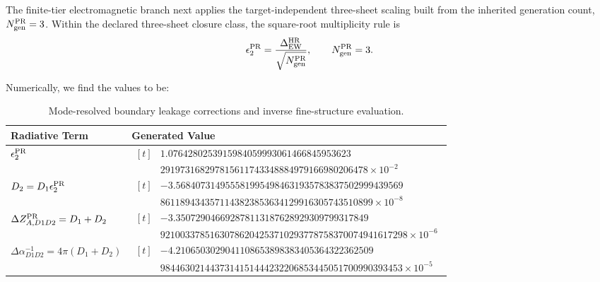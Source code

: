 \documentclass[11pt]{article}
\renewcommand{\arraystretch}{1.22}
\renewcommand{\arraystretch}{1.4}
\begin{document}
The finite-tier electromagnetic branch next applies the target-independent
three-sheet scaling built from the inherited generation count, $N_{\rm gen}^{\rm PR}=3$.  Within the declared three-sheet closure class, the
square-root multiplicity rule is
\begin{equation}
\epsilon_2^{\rm PR}
=
\frac{\Delta_{\rm EW}^{\rm HR}}{\sqrt{N_{\rm gen}^{\rm PR}}},
\qquad
N_{\rm gen}^{\rm PR}=3.
\end{equation}

Numerically, we find the values to be:

\begin{table}[htbp]
\centering
\caption{Mode-resolved boundary leakage corrections and inverse fine-structure evaluation.}
\label{tab:alpha-refinement-steps}
\renewcommand{\arraystretch}{1.8}
\begin{tabular}{>{\raggedright\arraybackslash}p{} l}
\toprule
\textbf{Radiative Term} & \textbf{Generated Value} \\
\midrule
$\epsilon_2^{\rm PR}$ & 
{\small $\begin{aligned}[t]
 & 1.0764280253915984059993061466845953623 \\
& 291973168297815611743348884979166980206478 \times 10^{-2}

\end{aligned}$} \\
\midrule
$D_2 = D_1\epsilon_2^{\rm PR}$ & 
{\small $\begin{aligned}[t]
& {-3.5684073149555819954984631935783837502999439569} \\
& 8611894343571143823853634129916305743510899 \times 10^{-8}
\end{aligned}$} \\
\midrule
$\Delta Z_{A,D1D2}^{\rm PR} = D_1+D_2$ & 
{\small $\begin{aligned}[t]
& {-3.350729046692878113187628929309799317849} \\
& 92100337851630786204253710293778758370074941617298 \times 10^{-6}
\end{aligned}$} \\
\midrule
$\Delta\alpha_{D1D2}^{-1} = 4\pi(D_1+D_2)$ & 
{\small $\begin{aligned}[t]
& {-4.2106503029041108653898383405364322362509} \\
& 9844630214437314151444232206853445051700990393453 \times 10^{-5}
\end{aligned}$} \\
\bottomrule
\end{tabular}
\end{table}
\end{document}
